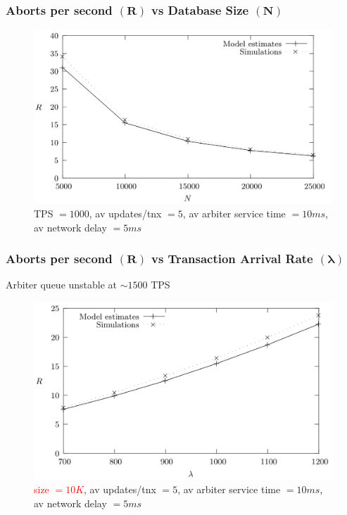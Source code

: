 \documentclass[aspectratio=169]{beamer}
\begin{document}

\begin{frame}
  \frametitle{Aborts per second $(\boldsymbol{R})$ vs Database Size $(\boldsymbol{N})$}
  \begin{figure}[h!]
    \centering
    \includegraphics[scale=0.35]{images/varying_num_edges.png}
    \caption{TPS $= 1000$, av updates/tnx $= 5$, av arbiter service time $= 10ms$, av network delay $=5ms$}
  \end{figure}
\end{frame}

\begin{frame}
  \frametitle{Aborts per second $(\boldsymbol{R})$ vs Transaction Arrival Rate $(\boldsymbol{\lambda})$}
  \begin{center}
    Arbiter queue unstable at $\sim1500$ TPS
  \end{center}
  \begin{figure}[h!]
    \centering
    \includegraphics[scale=0.35]{images/varying_tnx_arrival_rate}
    \caption{\textcolor{red}{size $= 10K$}, av updates/tnx $= 5$, av arbiter service time $= 10ms$, av network delay $=5ms$}
  \end{figure}
\end{frame}
\end{document}
